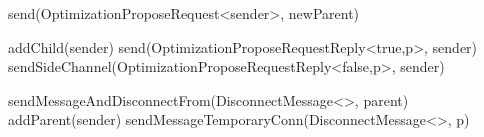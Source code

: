 \begin{algorithm}
\begin{algorithmic}[1]
         \label{alg:memb:active_view_maint:opt_propose_recv}
                \State send(OptimizationProposeRequest<sender>, newParent)
            \EndIf
        \asdend

         \label{alg:memb:active_view_maint:opt_propose_req_recv}
             
                \State addChild(sender)
                \State send(OptimizationProposeRequestReply<true,p>, sender)
            \Else
                \State sendSideChannel(OptimizationProposeRequestReply<false,p>, sender)
            \EndIf
        \asdend

         \label{alg:memb:active_view_maint:opt_propose_req_reply_recv}
                    \State sendMessageAndDisconnectFrom(DisconnectMessage<>, parent)
                    \State addParent(sender)
                \EndIf
            \Else
                \State sendMessageTemporaryConn(DisconnectMessage<>, p)
            \EndIf
        \asdend

    \end{algorithmic}
\end{algorithm}